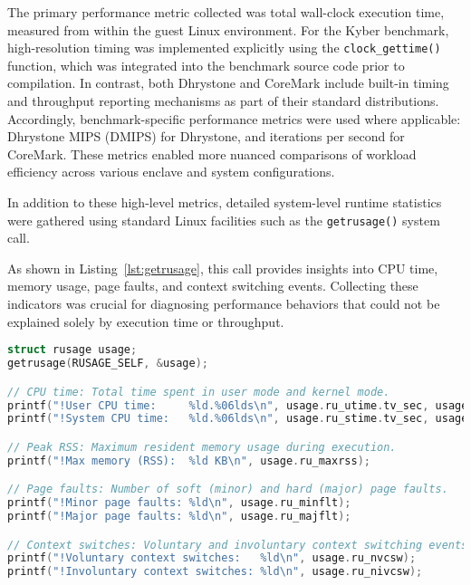 The primary performance metric collected was total wall-clock execution time, measured from within the guest Linux environment. For the Kyber benchmark, high-resolution timing was implemented explicitly using the \texttt{clock\_gettime()} function, which was integrated into the benchmark source code prior to compilation. In contrast, both Dhrystone and CoreMark include built-in timing and throughput reporting mechanisms as part of their standard distributions. Accordingly, benchmark-specific performance metrics were used where applicable: Dhrystone MIPS (DMIPS) for Dhrystone, and iterations per second for CoreMark. These metrics enabled more nuanced comparisons of workload efficiency across various enclave and system configurations.

In addition to these high-level metrics, detailed system-level runtime statistics were gathered using standard Linux facilities such as the \texttt{getrusage()} system call. 

As shown in Listing~\ref{lst:getrusage}, this call provides insights into CPU time, memory usage, page faults, and context switching events. Collecting these indicators was crucial for diagnosing performance behaviors that could not be explained solely by execution time or throughput.


\begin{lstlisting}[language=C, caption={In-enclave system-level instrumentation using \texttt{getrusage()}}, label={lst:getrusage}]
struct rusage usage;
getrusage(RUSAGE_SELF, &usage);

// CPU time: Total time spent in user mode and kernel mode.
printf("!User CPU time:     %ld.%06lds\n", usage.ru_utime.tv_sec, usage.ru_utime.tv_usec);
printf("!System CPU time:   %ld.%06lds\n", usage.ru_stime.tv_sec, usage.ru_stime.tv_usec);

// Peak RSS: Maximum resident memory usage during execution.
printf("!Max memory (RSS):  %ld KB\n", usage.ru_maxrss);

// Page faults: Number of soft (minor) and hard (major) page faults.
printf("!Minor page faults: %ld\n", usage.ru_minflt);
printf("!Major page faults: %ld\n", usage.ru_majflt);

// Context switches: Voluntary and involuntary context switching events.
printf("!Voluntary context switches:   %ld\n", usage.ru_nvcsw);
printf("!Involuntary context switches: %ld\n", usage.ru_nivcsw);
\end{lstlisting}

